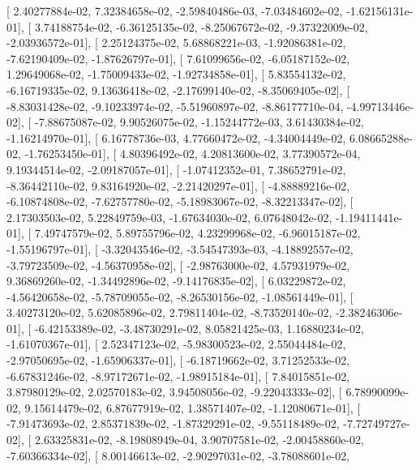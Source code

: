 \documentclass{article}
\begin{document}
       [  2.40277884e-02,   7.32384658e-02,  -2.59840486e-03,
         -7.03484602e-02,  -1.62156131e-01],
       [  3.74188754e-02,  -6.36125135e-02,  -8.25067672e-02,
         -9.37322009e-02,  -2.03936572e-01],
       [  2.25124375e-02,   5.68868221e-03,  -1.92086381e-02,
         -7.62190409e-02,  -1.87626797e-01],
       [  7.61099656e-02,  -6.05187152e-02,   1.29649068e-02,
         -1.75009433e-02,  -1.92734858e-01],
       [  5.83554132e-02,  -6.16719335e-02,   9.13636418e-02,
         -2.17699140e-02,  -8.35069405e-02],
       [ -8.83031428e-02,  -9.10233974e-02,  -5.51960897e-02,
         -8.86177710e-04,  -4.99713446e-02],
       [ -7.88675087e-02,   9.90526075e-02,  -1.15244772e-03,
          3.61430384e-02,  -1.16214970e-01],
       [  6.16778736e-03,   4.77660472e-02,  -4.34004449e-02,
          6.08665288e-02,  -1.76253450e-01],
       [  4.80396492e-02,   4.20813600e-02,   3.77390572e-04,
          9.19344514e-02,  -2.09187057e-01],
       [ -1.07412352e-01,   7.38652791e-02,  -8.36442110e-02,
          9.83164920e-02,  -2.21420297e-01],
       [ -4.88889216e-02,  -6.10874808e-02,  -7.62757780e-02,
         -5.18983067e-02,  -8.32213347e-02],
       [  2.17303503e-02,   5.22849759e-03,  -1.67634030e-02,
          6.07648042e-02,  -1.19411441e-01],
       [  7.49747579e-02,   5.89755796e-02,   4.23299968e-02,
         -6.96015187e-02,  -1.55196797e-01],
       [ -3.32043546e-02,  -3.54547393e-03,  -4.18892557e-02,
         -3.79723509e-02,  -4.56370958e-02],
       [ -2.98763000e-02,   4.57931979e-02,   9.36869260e-02,
         -1.34492896e-02,  -9.14176835e-02],
       [  6.03229872e-02,  -4.56420658e-02,  -5.78709055e-02,
         -8.26530156e-02,  -1.08561449e-01],
       [  3.40273120e-02,   5.62085896e-02,   2.79811404e-02,
         -8.73520140e-02,  -2.38246306e-01],
       [ -6.42153389e-02,  -3.48730291e-02,   8.05821425e-03,
          1.16880234e-02,  -1.61070367e-01],
       [  2.52347123e-02,  -5.98300523e-02,   2.55044484e-02,
         -2.97050695e-02,  -1.65906337e-01],
       [ -6.18719662e-02,   3.71252533e-02,  -6.67831246e-02,
         -8.97172671e-02,  -1.98915184e-01],
       [  7.84015851e-02,   3.87980129e-02,   2.02570183e-02,
          3.94508056e-02,  -9.22043333e-02],
       [  6.78990099e-02,   9.15614479e-02,   6.87677919e-02,
          1.38571407e-02,  -1.12080671e-01],
       [ -7.91473693e-02,   2.85371839e-02,  -1.87329291e-02,
         -9.55118489e-02,  -7.72749727e-02],
       [  2.63325831e-02,  -8.19808949e-04,   3.90707581e-02,
         -2.00458860e-02,  -7.60366334e-02],
       [  8.00146613e-02,  -2.90297031e-02,  -3.78088601e-02,
\end{document}
